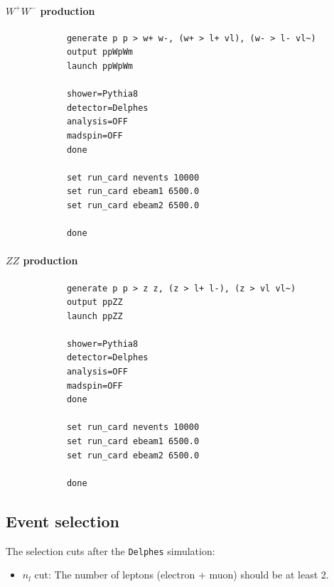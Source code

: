 \documentclass[12pt]{article}
\begin{document}
        \paragraph{$W^{+}W^{-}$ production}
        \begin{lstlisting}
            generate p p > w+ w-, (w+ > l+ vl), (w- > l- vl~)
            output ppWpWm
            launch ppWpWm

            shower=Pythia8
            detector=Delphes
            analysis=OFF
            madspin=OFF
            done

            set run_card nevents 10000
            set run_card ebeam1 6500.0
            set run_card ebeam2 6500.0

            done
        \end{lstlisting}
        \paragraph{$ZZ$ production}
        \begin{lstlisting}
            generate p p > z z, (z > l+ l-), (z > vl vl~)
            output ppZZ
            launch ppZZ

            shower=Pythia8
            detector=Delphes
            analysis=OFF
            madspin=OFF
            done

            set run_card nevents 10000
            set run_card ebeam1 6500.0
            set run_card ebeam2 6500.0

            done
        \end{lstlisting}
    \subsection{Event selection}%
    \label{sub:event_selection}
        The selection cuts after the \verb|Delphes| simulation:
        \begin{itemize}
            \item $n_{l}$ cut: The number of leptons (electron + muon) should be at least 2.
        \end{itemize}
\end{document}
